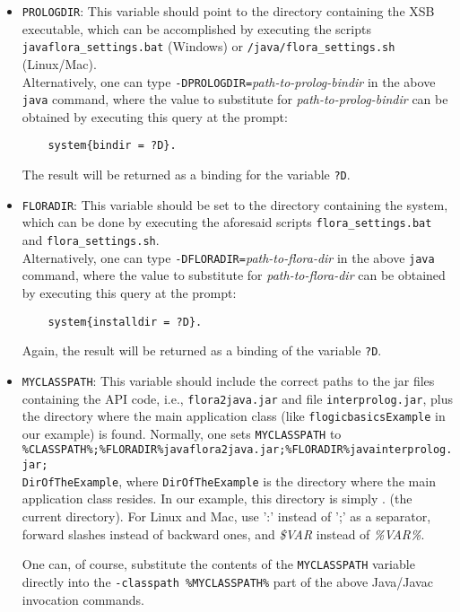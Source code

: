 \begin{itemize}
\begin{itemize}
\item
  {\tt PROLOGDIR}: This variable should point to the directory containing
  the XSB executable, which can be accomplished by executing the scripts
  \texttt{\ENGINENAMEALT\bs{}java\bs{}flora\_settings.bat} (Windows) or
  \texttt{\ENGINENAMEALT/java/flora\_settings.sh} (Linux/Mac).
  \\
  Alternatively, one can type
  \texttt{-DPROLOGDIR=}\emph{path-to-prolog-bindir}
  in the above \texttt{java} command, where the value to substitute for
  \emph{path-to-prolog-bindir} can be obtained 
  by executing this query at the prompt:
\begin{verbatim}
    system{bindir = ?D}.
\end{verbatim}
The result will be returned as a binding for the variable \texttt{?D}. 

\item
{\tt FLORADIR}: This variable should be set to the directory
containing the \FLSYSTEM system, which can be done by
executing the aforesaid scripts
\texttt{flora\_settings.bat} and \texttt{flora\_settings.sh}.
\\
Alternatively, one can type
\texttt{-DFLORADIR=}\emph{path-to-flora-dir}
  in the above \texttt{java} command, where the value to substitute for
  \emph{path-to-flora-dir} can be obtained 
  by executing this query at the prompt:
\begin{verbatim}
    system{installdir = ?D}.
\end{verbatim}
Again, the result will be returned as a binding of the variable \texttt{?D}. 

\item
{\tt MYCLASSPATH}: This variable should include the correct paths to the
jar files
containing the API code, i.e., \texttt{flora2java.jar} 
and file {\tt interprolog.jar}, plus the directory where the
main application class (like
\texttt{flogicbasicsExample} in our example) is found. 
Normally, one sets \texttt{MYCLASSPATH} to
\texttt{\small\%CLASSPATH\%;\%FLORADIR\%\bs{}java\bs{}flora2java.jar;\%FLORADIR\%\bs{}java\bs{}interprolog.jar;\\DirOfTheExample},
where \texttt{DirOfTheExample} is the directory where the main application
class resides.
In our example, this directory is
simply . (the current directory).
For Linux and Mac, use ':' instead of ';' as a separator, forward slashes
instead of backward ones, and \emph{\$VAR} 
instead of \emph{\%VAR\%}.

One can, of course, substitute the contents of the \texttt{MYCLASSPATH}
variable directly into the \texttt{-classpath \%MYCLASSPATH\%} part of the
above Java/Javac invocation commands.   


\end{itemize}
\end{itemize}
